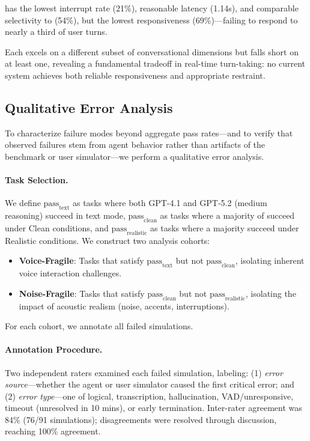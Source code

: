 \textbf{} has the lowest interrupt rate (21\%), reasonable latency (1.14s), and comparable selectivity to  (54\%), but the lowest responsiveness (69\%)---failing to respond to nearly a third of user turns.

Each  excels on a different subset of conversational dimensions but falls short on at least one, revealing a fundamental tradeoff in real-time turn-taking: no current system achieves both reliable responsiveness and appropriate restraint.

\subsection{Qualitative Error Analysis}
\label{sec:analysis}

To characterize failure modes beyond aggregate pass rates---and to verify that observed failures stem from agent behavior rather than artifacts of the benchmark or user simulator---we perform a qualitative error analysis.

\paragraph{Task Selection.} We define $\text{pass}_{\text{text}}$ as tasks where both GPT-4.1 and GPT-5.2 (medium reasoning) succeed in text mode, $\text{pass}_{\text{clean}}$ as tasks where a majority of  succeed under Clean conditions, and $\text{pass}_{\text{realistic}}$ as tasks where a majority succeed under Realistic conditions. We construct two analysis cohorts:
\begin{itemize}[nosep,leftmargin=*]
    \item \textbf{Voice-Fragile}: Tasks that satisfy $\text{pass}_{\text{text}}$ but not $\text{pass}_{\text{clean}}$, isolating inherent voice interaction challenges.
    \item \textbf{Noise-Fragile}: Tasks that satisfy $\text{pass}_{\text{clean}}$ but not $\text{pass}_{\text{realistic}}$, isolating the impact of acoustic realism (noise, accents, interruptions).
\end{itemize}
For each cohort, we annotate all failed simulations.

\paragraph{Annotation Procedure.} Two independent raters examined each failed simulation, labeling: (1) \textit{error source}---whether the agent or user simulator caused the first critical error; and (2) \textit{error type}---one of logical, transcription, hallucination, VAD/unresponsive, timeout (unresolved in 10 mins), or early termination. Inter-rater agreement was 84\% (76/91 simulations); disagreements were resolved through discussion, reaching 100\% agreement.

